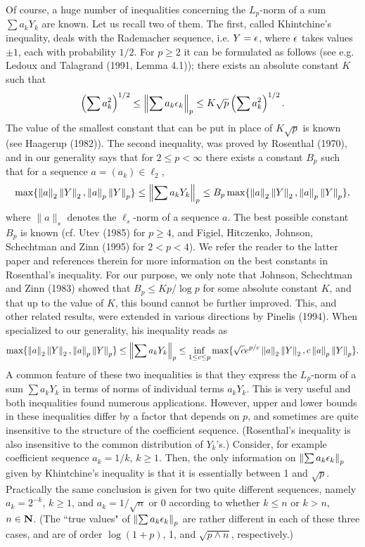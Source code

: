 Of course, a huge number of inequalities concerning the $L_p$-norm of a sum
$\sum a_kY_k$ are known. Let us recall two of them. The first, called
Khintchine's inequality, deals with the Rademacher sequence, i.e. $Y=\epsilon$,
where $\epsilon$ takes values $\pm 1$, each with probability $1/2$. For $p\ge
2$ it can be
formulated as follows (see e.g. Ledoux and Talagrand (1991, Lemma 4.1));
there exists an absolute constant $K$
such that
$$
\left(\sum a_k^2\right)^{1/2}\le \left\|\sum a_k\epsilon_k\right\|_p\le K\sqrt
p\left(\sum a_k^2\right)^{1/2}.
$$
The value of the smallest constant that can be put in place of $K\sqrt p$
is known (see Haagerup (1982)). The second inequality, was proved by
Rosenthal (1970), and in our generality says that for $2\le p<\infty$ there
exists a constant $B_p$ such that for a sequence $a=(a_k)\in\ell_2$, $$
\max\{\left\|a\right\|_2\left\|Y\right\|_2,\left\|a\right\|_p\left\|Y\right\|_p\}\le \left\|\sum
a_kY_k\right\|_p\le B_p\max\{\left\|a\right\|_2\left\|Y\right\|_2,\left\|a\right\|_p\left\|Y\right\|_p\}, $$
where $\|a\|_s$ denotes the $\ell_s$-norm of a sequence $a$. The best
possible constant $B_p$ is known (cf. Utev (1985) for $p\ge 4$, and Figiel,
Hitczenko, Johnson, Schechtman and Zinn (1995) for $2<p<4$). We refer the
reader to the latter paper and references therein for more information on
the best constants in Rosenthal's inequality. For our purpose, we only note
that Johnson, Schechtman and Zinn (1983) showed that $B_p\le Kp/\log p$ for
some absolute constant $K$, and that up to the value of $K$, this bound
cannot be further improved. This, and other related results, were extended
in various directions by Pinelis (1994). When specialized to our
generality, his inequality reads as $$ \max\{\left\|a\right\|_2\left\|Y\right\|_2,\left\|a\right\|_p\left\|Y\right\|_p\}\le \left\|\sum a_kY_k\right\|_p\le \inf_{1\le c\le p}\max\{\sqrt
ce^{p/c}\left\|a\right\|_2\left\|Y\right\|_2,c\left\|a\right\|_p\left\|Y\right\|_p\}. $$ A common feature
of these two inequalities is that they express the $L_p$-norm of a sum
$\sum a_kY_k$ in terms of norms of individual terms $a_kY_k$. This is very
useful and both inequalities found numerous applications. However, upper
and lower bounds in these inequalities differ by a factor that depends on
$p$, and sometimes are quite insensitive to the structure of the
coefficient sequence. (Rosenthal's inequality is also insensitive to the
common distribution of $Y_k$'s.) Consider, for example coefficient sequence
$a_k=1/k$, $k\ge 1$. Then, the only information on $\left\|\sum
a_k\epsilon_k\right\|_p$ given by Khintchine's inequality is that it is essentially
between 1 and $\sqrt p$.
Practically the same conclusion is given for two quite different sequences,
namely $a_k=2^{-k}$, $k\ge 1$,
and $a_k=1/\sqrt n $ or 0 according to whether $k\le n$ or $k>n$, $n\in{\bf
N}$. (The ``true values" of $\left\|\sum a_k\epsilon_k\right\|_p$ are rather different
in each of these three cases, and are of order $\log(1+p)$, 1, and
$\sqrt{p\wedge n}$, respectively.)

